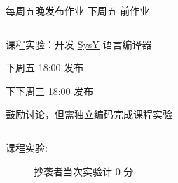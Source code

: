 \begin{frame}{}
  \begin{center}
    每周五晚发布作业 \qquad 下周五  前作业
  \end{center}

  \begin{columns}
    \vspace{-0.80cm}
    \begin{center}
    \end{center}
  \end{columns}
\end{frame}

\begin{frame}{}
  \begin{center}
    课程实验：开发 \href{https://compiler.educg.net/}{\textsf{SysY}} 语言编译器


    \vspace{0.30cm}
  \end{center}
\end{frame}

\begin{frame}{}
  \begin{center}
      下周五 18:00 发布 \\[5pt]

    \vspace{0.10cm}

    \vspace{0.10cm}
      下下周三 18:00 发布 \\[5pt]
  \end{center}
\end{frame}

\begin{frame}
  \begin{center}
    鼓励讨论，但需独立编码完成课程实验
  \end{center}

  \pause
  \begin{columns}
    \begin{description}
      \item[课程实验:] 抄袭者当次实验计 $0$ 分
    \end{description}
  \end{columns}
\end{frame}

